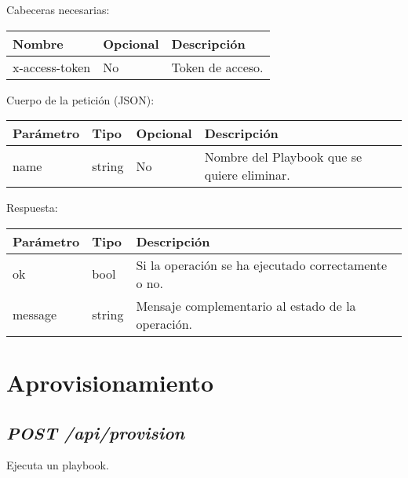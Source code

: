 		Cabeceras necesarias:
		\begin{table}[h!]
			\centering
	\begin{adjustbox}{max width=\textwidth}
			\begin{tabular}{|l|l|l|}
				\hline
				Nombre & Opcional & Descripción \\ \hline
				x-access-token & No & Token de acceso. \\ \hline
			\end{tabular}
\end{adjustbox}
		\end{table}
		
		Cuerpo de la petición (JSON):
		\begin{table}[!h]
			\centering
	\begin{adjustbox}{max width=\textwidth}
			\begin{tabular}{|l|l|l|l|}
				\hline
				Parámetro & Tipo & Opcional & Descripción \\ \hline
				name & string & No & Nombre del Playbook que se quiere eliminar. \\ \hline
			\end{tabular}
\end{adjustbox}
		\end{table}
		
		Respuesta:
		\begin{table}[!h]
			\centering
	\begin{adjustbox}{max width=\textwidth}
			\begin{tabular}{|l|l|l|}
				\hline
				Parámetro & Tipo & Descripción \\ \hline
				ok & bool & Si la operación se ha ejecutado correctamente o no. \\ \hline
				message & string & Mensaje complementario al estado de la operación. \\ \hline
			\end{tabular}
\end{adjustbox}
		\end{table}











\section{Aprovisionamiento}


	\subsection{\textit{POST /api/provision}}
		Ejecuta un playbook.
	
